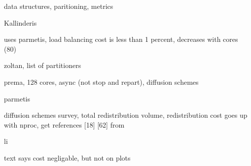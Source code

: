 \documentclass{article}
\begin{document}
data structures, paritioning, metrics
\cite{flaherty-parallel-data-structures}

Kallinderis
\cite{kallinderis-load-balance,minyard-kallinderis-load-balance}

uses parmetis, load balancing cost is less than 1 percent, decreases with cores (80)
\cite{eccomas-2010-para-perf-adapt}

zoltan, list of partitioners
\cite{devine-anm-2005-zoltan-load-balancing}

prema, 128 cores, async (not stop and repart), diffusion schemes
\cite{chrisochoides-ieee-tpds-2004-load-balance}

parmetis
\cite{parmetis-sc-2000}

diffusion schemes survey, total redistribution volume, redistribution cost goes up with nproc,
get references [18] [62] from
\cite{oliker-thesis}

li
\cite{li-masters-thesis,li-load-balance}

text says cost negligable, but not on plots
\cite{park-para-unsteady-adapt}



\end{document}

